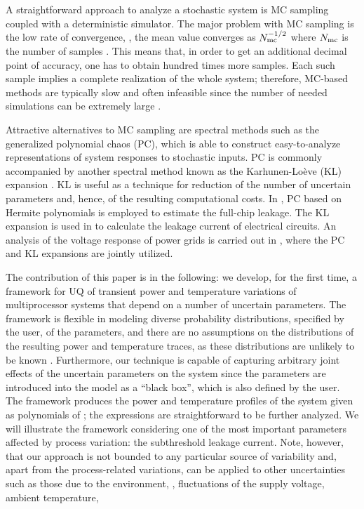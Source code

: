 
A straightforward approach to analyze a stochastic system is MC sampling coupled with a deterministic simulator. The major problem with MC sampling is the low rate of convergence, \eg, the mean value converges as $N_\text{mc}^{-{{1}/{2}}}$ where $N_\text{mc}$ is the number of samples \cite{xiu2010, maitre2010}. This means that, in order to get an additional decimal point of accuracy, one has to obtain hundred times more samples. Each such sample implies a complete realization of the whole system; therefore, MC-based methods are typically slow and often infeasible since the number of needed simulations can be extremely large \cite{diaz-emparanza2002}.

Attractive alternatives to MC sampling are spectral methods \cite{xiu2010, maitre2010} such as the generalized polynomial chaos (PC), which is able to construct easy-to-analyze representations of system responses to stochastic inputs. PC is commonly accompanied by another spectral method known as the Karhunen-Lo\`{e}ve (KL) expansion \cite{ghanem1991}. KL is useful as a technique for reduction of the number of uncertain parameters and, hence, of the resulting computational costs. In \cite{shen2009}, PC based on Hermite polynomials is employed to estimate the full-chip leakage. The KL expansion is used in \cite{bhardwaj2006} to calculate the leakage current of electrical circuits. An analysis of the voltage response of power grids is carried out in \cite{ghanta2006}, where the PC and KL expansions are jointly utilized.

The contribution of this paper is in the following: we develop, for the first time, a framework for UQ of transient power and temperature variations of multiprocessor systems that depend on a number of uncertain parameters. The framework is flexible in modeling diverse probability distributions, specified by the user, of the parameters, and there are no assumptions on the distributions of the resulting power and temperature traces, as these distributions are unlikely to be known \apriori. Furthermore, our technique is capable of capturing arbitrary joint effects of the uncertain parameters on the system since the parameters are introduced into the model as a ``black box'', which is also defined by the user. The framework produces the power and temperature profiles of the system given as polynomials of \rvs; the expressions are straightforward to be further analyzed. We will illustrate the framework considering one of the most important parameters affected by process variation: the subthreshold leakage current. Note, however, that our approach is not bounded to any particular source of variability and, apart from the process-related variations, can be applied to other uncertainties such as those due to the environment, \ie, fluctuations of the supply voltage, ambient temperature, \etc
